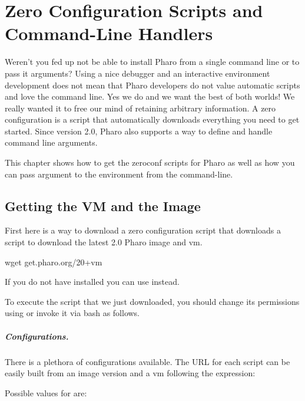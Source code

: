 \documentclass[a4paper,10pt,twoside]{book}
\begin{document}
\fi
\sloppy

\chapter{Zero Configuration Scripts and Command-Line Handlers}

Weren't you fed up not be able to install Pharo from a single command line or to pass it arguments? 
Using a nice debugger and an interactive environment development does not 
mean that Pharo developers do not value automatic scripts and love the command line.
Yes we do and we want the best of both worlds! We really wanted it to free our mind of retaining arbitrary information. A zero configuration is a script that automatically downloads everything you need to get started. Since version 2.0, Pharo also supports a way to define and handle command line arguments. 

This chapter shows how to get the zeroconf scripts for Pharo as well as how you can pass argument to the environment from the command-line.


\section{Getting the VM and the Image}
First here is a way to download a zero configuration script that downloads a script to download the latest 2.0 Pharo image and vm. 

\begin{code}{}
wget get.pharo.org/20+vm
\end{code}

If you do not have  installed you can use  instead.

To execute the script that we just downloaded, you should change its permissions using   or invoke it via bash as follows. 

\paragraph{Configurations.}
There is a plethora of configurations available. The URL for each script can
be easily built from an image version and a vm following the expression: 
	
Possible values for  are: 
\end{document}
